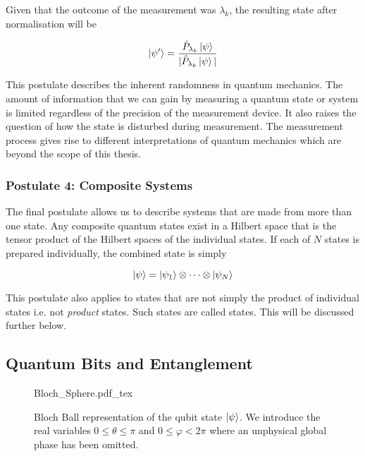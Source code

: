 Given that the outcome of the measurement was $\lambda_k$, the resulting state after normalisation will be

\begin{equation}
	\ket{\psi'} = \frac{\hat{P}_{\lambda_k}\ket{\psi}}{|\hat{P}_{\lambda_k}\ket{\psi}|}
\end{equation}

This postulate describes the inherent randomness in quantum mechanics. The amount of information that we can gain by measuring a quantum state or system is limited regardless of the precision of the measurement device. It also raises the question of how the state is disturbed during measurement. The measurement process gives rise to different interpretations of quantum mechanics which are beyond the scope of this thesis.


\subsubsection*{Postulate 4: Composite Systems}

The final postulate allows us to describe systems that are made from more than one state. Any composite quantum states exist in a Hilbert space that is the tensor product of the Hilbert spaces of the individual states. If each of $N$ states is prepared individually, the combined state is simply

\begin{equation}
	\ket{\psi} = \ket{\psi_1}\otimes\cdots\otimes\ket{\psi_N}
\end{equation}

This postulate also applies to states that are not simply the product of individual states i.e. not \emph{product} states. Such states are called  states. This will be discussed further below.

\subsection{Quantum Bits and Entanglement}

\begin{figure}
	\centering
	\def\svgwidth{0.4\textwidth}
   	{Bloch_Sphere.pdf_tex}
   	\caption[Bloch sphere representation of a qubit]{Bloch Ball representation of the qubit state $\ket{\psi}$. We introduce the real variables $0\le\theta\le\pi$ and $0\le\varphi<2\pi$ where an unphysical global phase has been omitted.}
   	\label{fig:bloch}
\end{figure}

